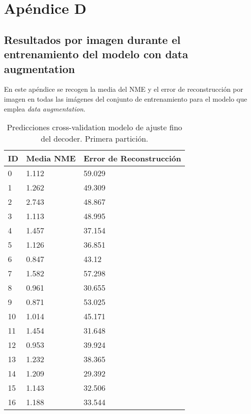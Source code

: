 
\chapter{Apéndice D}\label{ap:apendiceD}

\section*{Resultados por imagen durante el entrenamiento del modelo con data augmentation}

En este apéndice se recogen la media del NME y el error de reconstrucción por imagen en todas las imágenes del conjunto de entrenamiento para el modelo que emplea \textit{data augmentation}.

\begin{table}[!ht]
    \centering
    \caption{Predicciones cross-validation modelo de ajuste fino del  decoder. Primera partición.}
    \begin{tabular}{|l|l|l|}
    \hline
    \cellcolor{gray!25}\textbf{ID} & \cellcolor{gray!25}\textbf{Media NME} & \cellcolor{gray!25}\textbf{Error de Reconstrucción}\\ \hline
        0 & 1.112 & 59.029 \\ \hline
        1 & 1.262 & 49.309 \\ \hline
        2 & 2.743 & 48.867 \\ \hline
        3 & 1.113 & 48.995 \\ \hline
        4 & 1.457 & 37.154 \\ \hline
        5 & 1.126 & 36.851 \\ \hline
        6 & 0.847 & 43.12 \\ \hline
        7 & 1.582 & 57.298 \\ \hline
        8 & 0.961 & 30.655 \\ \hline
        9 & 0.871 & 53.025 \\ \hline
        10 & 1.014 & 45.171 \\ \hline
        11 & 1.454 & 31.648 \\ \hline
        12 & 0.953 & 39.924 \\ \hline
        13 & 1.232 & 38.365 \\ \hline
        14 & 1.209 & 29.392 \\ \hline
        15 & 1.143 & 32.506 \\ \hline
        16 & 1.188 & 33.544 \\ \hline

\end{tabular}
\end{table}
